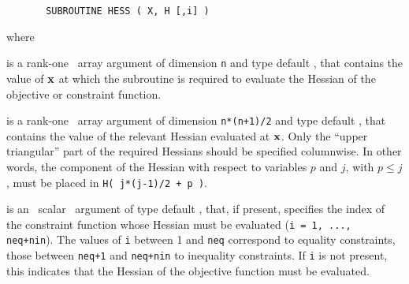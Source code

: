 \documentclass{galahad}
\begin{document}
\def\baselinestretch{0.8}
{\tt \begin{verbatim}
       SUBROUTINE HESS ( X, H [,i] )
\end{verbatim} }
\def\baselinestretch{1.0}
\noindent
where
\begin{description}
 is a rank-one \intentin\ array argument of 
dimension {\tt n} and type default \realdp,
that contains the value of ${\mathbf{x}}$ at which the
subroutine is required to evaluate the Hessian
of the objective or constraint function.

 is a rank-one \intentout\ array argument of dimension {\tt n*(n+1)/2}
  and type default \realdp, that contains the value of the relevant
  Hessian evaluated at ${\mathbf{x}}$. Only the ``upper triangular'' part of the
  required Hessians should be specified columnwise. In other words, the
  component of the Hessian with respect to  variables $p$ and $j$, with
  $p \leq j$, must be  placed in {\tt H( j*(j-1)/2 + p )}.

 is an \optional\ scalar \intentin\ argument of type default \integer,
that, if present, specifies the index of the constraint function whose
Hessian must be evaluated  ({\tt i = 1, ..., neq+nin}). The values of {\tt i}
between 1 and {\tt neq} correspond to equality constraints, those between
{\tt neq+1} and {\tt neq+nin} to inequality constraints.
If {\tt i} is not
present, this indicates that the Hessian of the objective function must be
evaluated.
\end{description}

\galerrors\label{serrors}
\end{document}
